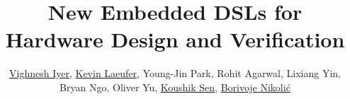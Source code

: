\documentclass[sigplan,review,nonacm,9pt]{acmart}
\begin{document}
\title{New Embedded DSLs for Hardware Design and Verification}


\author{{\normalsize \href{https://orcid.org/0000-0001-6934-6577}{Vighnesh Iyer}, \href{https://orcid.org/0000-0003-0942-7070}{Kevin Laeufer}, Young-Jin Park, Rohit Agarwal, Lixiang Yin, Bryan Ngo, Oliver Yu, \href{https://orcid.org/0000-0002-4539-9188}{Koushik Sen}, \href{https://orcid.org/0000-0003-2324-1715}{Borivoje Nikolić}}}



\renewcommand{\shortauthors}{Iyer, Vighnesh et al.}
\end{document}
